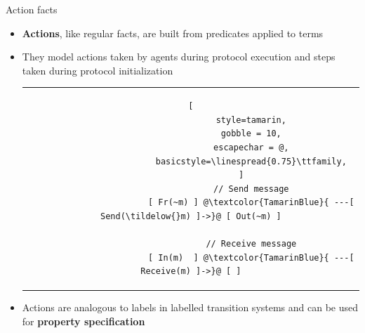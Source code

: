 \documentclass[11pt,aspectratio=169]{beamer}
\begin{document}
\begin{frame}[fragile]{Action facts}
    \begin{itemize}
        \item \textbf{Actions}, like regular facts, are built from predicates 
              applied to terms
        \item They model actions taken by agents during protocol execution and 
              steps taken during protocol initialization
        \vspace*{.5cm}
        \begin{onlyenv}
            \begin{table}[]
                \hspace*{-10cm}
                \begin{tabular}{c}
                    \begin{lstlisting}[
                        style=tamarin,
                        gobble = 10,
                        escapechar = @,
                        basicstyle=\linespread{0.75}\ttfamily,
                    ]
                        // Send message
                        [ Fr(~m) ] @\textcolor{TamarinBlue}{ ---[ Send(\tildelow{}m) ]->}@ [ Out(~m) ]

                        // Receive message
                        [ In(m)  ] @\textcolor{TamarinBlue}{ ---[ Receive(m) ]->}@ [ ]
                    \end{lstlisting}
                \end{tabular}
            \end{table}
        \end{onlyenv}
        \item Actions are analogous to labels in labelled transition systems and can be used for \textbf{property specification}
    \end{itemize}
\end{frame}
\end{document}
